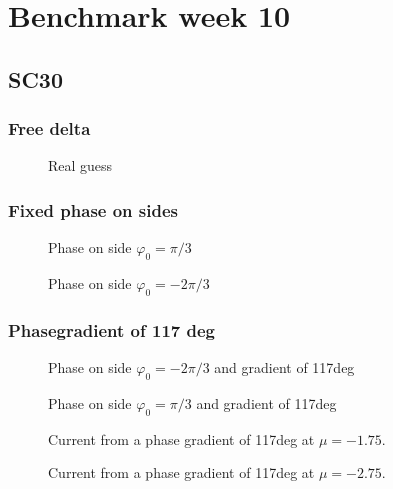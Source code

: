 \documentclass[../main.tex]{subfiles}
\begin{document}
\section{Benchmark week 10}
\subsection{SC30}
\subsubsection{Free delta}
\begin{figure}[H]
    
    \caption{Real guess}
\end{figure}
\subsubsection{Fixed phase on sides}
\begin{figure}[H]
    
    \caption{Phase on side $\varphi_0 = \pi/3$}
\end{figure}
\begin{figure}[H]
    
    \caption{Phase on side $\varphi_0 = -2\pi/3$}
\end{figure}

\subsubsection{Phasegradient of 117 deg}
\begin{figure}[H]
    
    \caption{Phase on side $\varphi_0 = -2\pi/3$ and gradient of 117deg}
\end{figure}
\begin{figure}[H]
    
    \caption{Phase on side $\varphi_0 = \pi/3$ and gradient of 117deg}
\end{figure}

\begin{figure}[H]
    
    \caption{Current from a phase gradient of 117deg at $\mu = -1.75$.}
\end{figure}
\begin{figure}[H]
    
    \caption{Current from a phase gradient of 117deg at $\mu = -2.75$.}
\end{figure}
\end{document}
